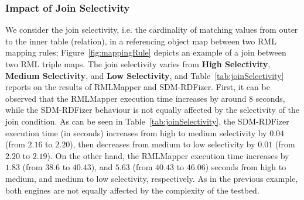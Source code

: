 \subsubsection{Impact of Join Selectivity}
We consider the join selectivity, i.e. the cardinality of matching values from outer to the inner table (relation), in a referencing object map between two RML mapping rules; Figure~\ref{fig:mappingRule} depicts an example of a join between two RML triple maps. The join selectivity varies from 
\textbf{High Selectivity}, \textbf{Medium Selectivity}, and \textbf{Low Selectivity}, and Table~\ref{tab:joinSelectivity} reports on the results of RMLMapper and  SDM-RDFizer. First, it can be observed that the RMLMapper execution time increases by around $8$ seconds, while the SDM-RDFizer behaviour is not equally affected by the selectivity of the join condition. As can be seen in Table~\ref{tab:joinSelectivity}, the SDM-RDFizer execution time (in seconds) increases from high to medium selectivity by $0.04$ (from $2.16$ to $2.20$), then decreases from medium to low selectivity by $0.01$ (from $2.20$ to $2.19$).
On the other hand, the RMLMapper execution time increases by $1.83$ (from $38.6$ to $40.43$), and $5.63$ (from $40.43$ to $46.06$) seconds from high to medium, and medium to low selectivity, respectively. As in the previous example, both engines are not equally affected by the complexity of the testbed. 

